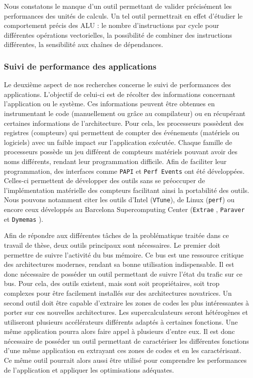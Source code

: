                 Nous constatons le manque d'un outil permettant de valider précisément les performances des unités de calculs. Un tel outil permettrait en effet d'étudier le comportement précis des ALU : le nombre d'instructions par cycle pour différentes opérations vectorielles, la possibilité de combiner des instructions différentes, la sensibilité aux chaînes de dépendances.
                
                
        \subsubsection{Suivi de performance des applications}
        
            Le deuxième aspect de nos recherches concerne le suivi de performances des applications. L'objectif de celui-ci est de récolter des informations concernant l'application ou le système. Ces informations peuvent être obtenues en instrumentant le code (manuellement ou grâce au compilateur) ou en récupérant certaines informations de l'architecture. Pour cela, les processeurs possèdent des registres (compteurs) qui permettent de compter des événements (matériels ou logiciels) avec un faible impact sur l'application exécutée. Chaque famille de processeurs possède un jeu différent de compteurs matériels pouvant avoir des noms différents, rendant leur programmation difficile. Afin de faciliter leur programmation, des interfaces comme \verb=PAPI= \cite{Browne2000} et \verb=Perf Events= \cite{Weaver2013} ont été développées. Celles-ci permettent de développer des outils sans se préoccuper de l'implémentation matérielle des compteurs facilitant ainsi la portabilité des outils. Nous pouvons notamment citer les outils d'Intel (\verb=VTune=), de Linux (\verb=perf=) ou encore ceux développés au Barcelona Supercomputing Center (\verb=Extrae= \cite{Rodriguez}, \verb=Paraver= \cite{Pillet1995} et \verb=Dymemas= \cite{Labarta1997}).
            
            Afin de répondre aux différentes tâches de la problématique traitée dans ce travail de thèse, deux outils principaux sont nécessaires. 
            Le premier doit permettre de suivre l'activité du bus mémoire. Ce bus est une ressource critique des architectures modernes, rendant sa bonne utilisation indispensable. Il est donc nécessaire de posséder un outil permettant de suivre l'état du trafic sur ce bus. Pour cela, des outils existent, mais sont soit propriétaires, soit trop complexes pour être facilement installés sur des architectures novatrices. 
            Un second outil doit être capable d'extraire les zones de codes les plus intéressantes à porter sur ces nouvelles architectures. Les supercalculateurs seront hétérogènes et utiliseront plusieurs accélérateurs différents adaptés à certaines fonctions. Une même application pourra alors faire appel à plusieurs d'entre eux. Il est donc nécessaire de posséder un outil permettant de caractériser les différentes fonctions d'une même application en extrayant ces zones de codes et en les caractérisant.  Ce même outil pourrait alors aussi être utilisé pour comprendre les performances de l'application et appliquer les optimisations adéquates. 

